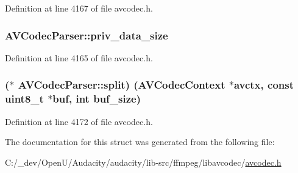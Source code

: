 Definition at line 4167 of file avcodec.\+h.

\subsubsection[{\texorpdfstring{priv\+\_\+data\+\_\+size}{priv_data_size}}]{ A\+V\+Codec\+Parser\+::priv\+\_\+data\+\_\+size}\hypertarget{struct_a_v_codec_parser_a33c342399b903fe66ee3560003346ce1}{}\label{struct_a_v_codec_parser_a33c342399b903fe66ee3560003346ce1}


Definition at line 4165 of file avcodec.\+h.

\subsubsection[{\texorpdfstring{split}{split}}]{($\ast$ A\+V\+Codec\+Parser\+::split) ({\bf A\+V\+Codec\+Context} $\ast$avctx, {\bf const} {\bf uint8\+\_\+t} $\ast${\bf buf}, {\bf int} buf\+\_\+size)}\hypertarget{struct_a_v_codec_parser_a3892ba0125d96730e73b88393752468b}{}\label{struct_a_v_codec_parser_a3892ba0125d96730e73b88393752468b}


Definition at line 4172 of file avcodec.\+h.



The documentation for this struct was generated from the following file\+:\begin{DoxyCompactItemize}
\item 
C\+:/\+\_\+dev/\+Open\+U/\+Audacity/audacity/lib-\/src/ffmpeg/libavcodec/\hyperlink{avcodec_8h}{avcodec.\+h}\end{DoxyCompactItemize}
